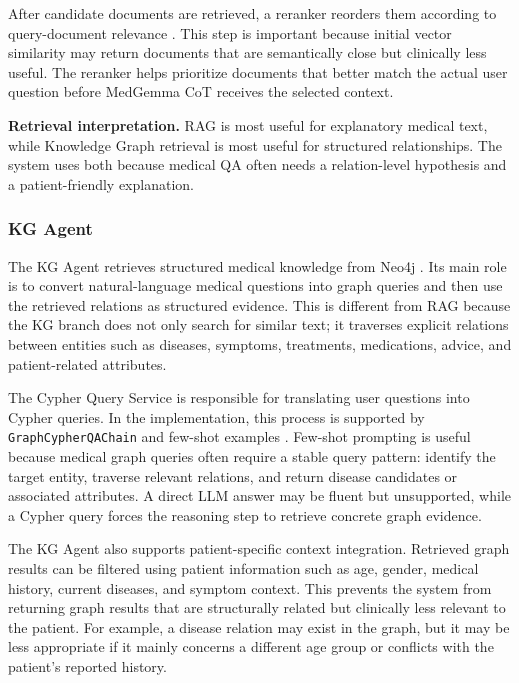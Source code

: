 After candidate documents are retrieved, a reranker reorders them according to query-document relevance \cite{reranking_search}. This step is important because initial vector similarity may return documents that are semantically close but clinically less useful. The reranker helps prioritize documents that better match the actual user question before MedGemma CoT receives the selected context.

\textbf{Retrieval interpretation.} RAG is most useful for explanatory medical text, while Knowledge Graph retrieval is most useful for structured relationships. The system uses both because medical QA often needs a relation-level hypothesis and a patient-friendly explanation.

\subsubsection{KG Agent}

The KG Agent retrieves structured medical knowledge from Neo4j \cite{neo4j_cypher_doc}. Its main role is to convert natural-language medical questions into graph queries and then use the retrieved relations as structured evidence. This is different from RAG because the KG branch does not only search for similar text; it traverses explicit relations between entities such as diseases, symptoms, treatments, medications, advice, and patient-related attributes.

The Cypher Query Service is responsible for translating user questions into Cypher queries. In the implementation, this process is supported by \texttt{GraphCypherQAChain} and few-shot examples \cite{langchain_graphcypherqa}. Few-shot prompting is useful because medical graph queries often require a stable query pattern: identify the target entity, traverse relevant relations, and return disease candidates or associated attributes. A direct LLM answer may be fluent but unsupported, while a Cypher query forces the reasoning step to retrieve concrete graph evidence.

The KG Agent also supports patient-specific context integration. Retrieved graph results can be filtered using patient information such as age, gender, medical history, current diseases, and symptom context. This prevents the system from returning graph results that are structurally related but clinically less relevant to the patient. For example, a disease relation may exist in the graph, but it may be less appropriate if it mainly concerns a different age group or conflicts with the patient's reported history.

